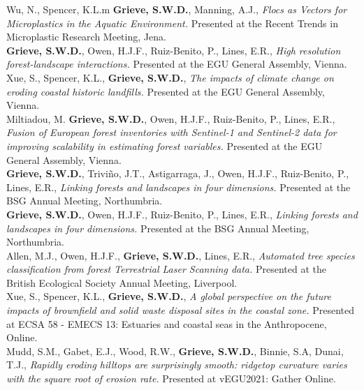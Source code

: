 \documentclass[10pt, a4paper]{article}
\newcommand{\student}{\textbf{\textsuperscript{\textdagger}}}
\newcommand{\years}[1]{\marginnote{\scriptsize #1}}
\begin{document}
\years{2023}Wu, N.\student, Spencer, K.L.m \textbf{Grieve, S.W.D.}, Manning, A.J., \textit{Flocs as Vectors for Microplastics in the Aquatic Environment.} Presented at the Recent Trends in Microplastic Research Meeting, Jena.\\[0.05cm]

\years{2023}\textbf{Grieve, S.W.D.}, Owen, H.J.F., Ruiz-Benito, P., Lines, E.R., \textit{High resolution forest-landscape interactions.} Presented at the EGU General Assembly, Vienna.\\[0.5cm]

\years{2023}Xue, S.\student, Spencer, K.L., \textbf{Grieve, S.W.D.}, \textit{The impacts of climate change on eroding coastal historic landfills.} Presented at the EGU General Assembly, Vienna.\\[0.05cm]

\years{2023} Miltiadou, M. \textbf{Grieve, S.W.D.}, Owen, H.J.F., Ruiz-Benito, P., Lines, E.R., \textit{Fusion of European forest inventories with Sentinel-1 and Sentinel-2 data for improving scalability in estimating forest variables.} Presented at the EGU General Assembly, Vienna.\\[0.05cm]

\years{2022}\textbf{Grieve, S.W.D.}, Trivi\~{n}o, J.T., Astigarraga, J., Owen, H.J.F., Ruiz-Benito, P., Lines, E.R., \textit{Linking forests and landscapes in four dimensions.} Presented at the BSG Annual Meeting, Northumbria.\\[0.05cm]

\years{2022}\textbf{Grieve, S.W.D.}, Owen, H.J.F., Ruiz-Benito, P., Lines, E.R., \textit{Linking forests and landscapes in four dimensions.} Presented at the BSG Annual Meeting, Northumbria.\\[0.05cm]

\years{2021}Allen, M.J.\student, Owen, H.J.F., \textbf{Grieve, S.W.D.}, Lines, E.R., \textit{Automated tree species classification from forest Terrestrial Laser Scanning data.} Presented at the British Ecological Society Annual Meeting, Liverpool.\\[0.05cm]

\years{2021}Xue, S.\student, Spencer, K.L., \textbf{Grieve, S.W.D.}, \textit{A global perspective on the future impacts of brownfield and solid waste disposal sites in the coastal zone.} Presented at ECSA 58 - EMECS 13: Estuaries and coastal seas in the Anthropocene, Online.\\[0.05cm]

\years{2021}Mudd, S.M., Gabet, E.J., Wood, R.W., \textbf{Grieve, S.W.D.}, Binnie, S.A, Dunai, T.J., \textit{Rapidly eroding hilltops are surprisingly smooth: ridgetop curvature varies with the square root of erosion rate.} Presented at vEGU2021: Gather Online.\\[0.05cm]
\end{document}
